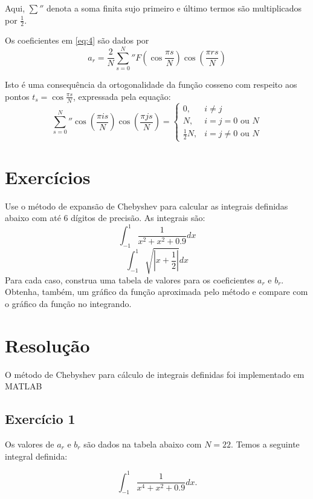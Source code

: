 \documentclass[10pt,a4paper]{article}
\begin{document}
	Aqui, ${\sum}''$ denota a soma finita sujo primeiro e último termos são multiplicados por $\frac{1}{2}$.
	
	Os coeficientes em \ref{eq:4} são dados por
	\[a_r = \frac{2}{N}{\sum_{s=0}^N}'' F\left(\cos{\frac{\pi s}{N}}\right)\cos{\left(\frac{\pi r s}{N}\right)}\]
	
	Isto é uma consequência da ortogonalidade da função cosseno com respeito aos pontos $t_s=\cos{\frac{\pi s}{N}}$, expressada pela equação:
	\[{\sum_{s=0}^N}'' \cos{\left(\frac{\pi i s}{N}\right)}\cos{\left(\frac{\pi j s}{N}\right)} = \begin{cases}0,&i\neq j\\N,&i=j=0\mbox{ ou }N\\\frac{1}{2}N,&i=j\neq 0\mbox{ ou }N\end{cases}\]
	
	\section{Exercícios}
	Use o método de expansão de Chebyshev para calcular as integrais definidas abaixo com até 6 dígitos de precisão. As integrais são:
	\[\int_{-1}^1 \frac{1}{x^2+x^2+0.9}dx\]
	\[\int_{-1}^1 \sqrt{\left|x+\frac{1}{2}\right|}dx\]
	\noindent Para cada caso, construa uma tabela de valores para os coeficientes $a_r$ e $b_r$. Obtenha, também, um gráfico da função aproximada pelo método e compare com o gráfico da função no integrando.
	
	\section{Resolução}
	
	O método de Chebyshev para cálculo de integrais definidas foi implementado em MATLAB
	
	\subsection{Exercício 1}
	Os valores de $a_r$ e $b_r$ são dados na tabela abaixo com $N=22$. Temos a seguinte integral definida:
    
    \[\int_{-1}^1 \frac{1}{x^4+x^2+0.9} dx.\]
\end{document}
